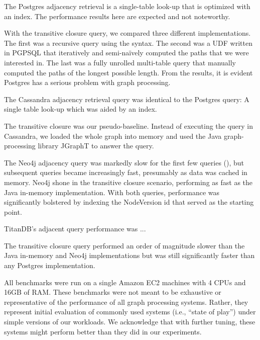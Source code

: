 \documentclass{sig-alternate}
\begin{document}
 The Postgres adjacency retrieval is a single-table look-up that is optimized with an index. 
The performance results here are expected and not noteworthy.

With the transitive closure query, we compared three different implementations. The first was a recursive query using the  syntax. 
The second was a UDF written in PGPSQL that iteratively and semi-naïvely computed the paths that we were interested in. 
The last was a fully unrolled multi-table query that manually computed the paths of the longest possible length. From  the results, it is evident Postgres has a serious problem with graph processing.

 The Cassandra adjacency retrieval query was identical to the Postgres query: A single table look-up which was aided by an index.

The transitive closure was our pseudo-baseline. Instead of executing the query in Cassandra, we loaded the whole graph into memory and used the Java graph-processing library JGraphT to answer the query.

 The Neo4j adjacency query was markedly slow for the first few queries (), but subsequent queries became increasingly fast, presumably as data was cached in memory. Neo4j shone in the transitive closure scenario, performing as fast as the Java in-memory implementation. With both queries, performance was significantly bolstered by indexing the NodeVersion id that served as the starting point.

 TitanDB's adjacent query performance was ... 

The transitive closure query performed an order of magnitude slower than the Java in-memory and Neo4j implementations but was still significantly faster than any Postgres implementation.

\smallitembot

All benchmarks were run on a single Amazon EC2  machines with 4 CPUs and 16GB of RAM. 
These benchmarks were not meant to be exhaustive or representative of the performance of all graph processing systems. 
Rather, they represent initial evaluation of commonly used systems (i.e., ``state of play'') under simple versions of our workloads.
We acknowledge that with further tuning, these systems might perform better than they did in our experiments.

\end{document}
